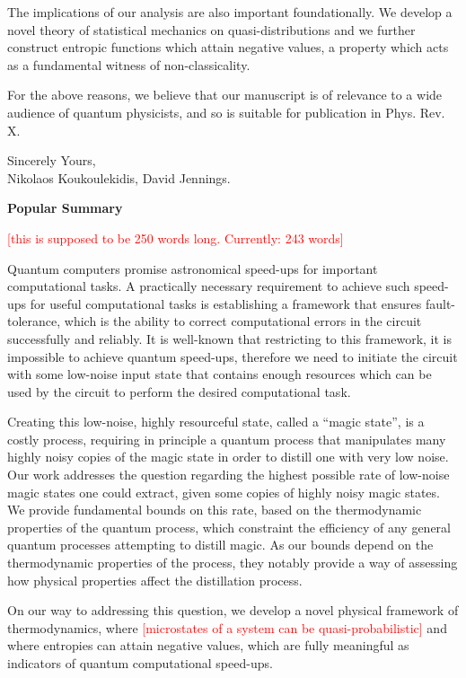 \documentclass[11pt]{letter}
\newcommand{\nick}[1]{\textcolor{red}{[#1]}}
\begin{document}
The implications of our analysis are also important foundationally.
We develop a novel theory of statistical mechanics on quasi-distributions and we further construct entropic functions which attain negative values, a property which acts as a fundamental witness of non-classicality.

For the above reasons, we believe that our manuscript is of relevance to a wide audience of quantum physicists, and so is suitable for publication in Phys. Rev. X.

\vspace{1cm}
\hspace{8cm}
\begin{minipage}{9cm}
\flushleft
Sincerely Yours,\\

Nikolaos Koukoulekidis, David Jennings.
\end{minipage}
\newpage


\textbf{Popular Summary}

\nick{this is supposed to be 250 words long. Currently: 243 words}

Quantum computers promise astronomical speed-ups for important computational tasks.
A practically necessary requirement to achieve such speed-ups for useful computational tasks is establishing a framework that ensures fault-tolerance, which is the ability to correct computational errors in the circuit successfully and reliably.
It is well-known that restricting to this framework, it is impossible to achieve quantum speed-ups, therefore we need to initiate the circuit with some low-noise input state that contains enough resources which can be used by the circuit to perform the desired computational task.

Creating this low-noise, highly resourceful state, called a ``magic state'', is a costly process, requiring in principle a quantum process that manipulates many highly noisy copies of the magic state in order to distill one with very low noise.
Our work addresses the question regarding the highest possible rate of low-noise magic states one could extract, given some copies of highly noisy magic states.
We provide fundamental bounds on this rate, based on the thermodynamic properties of the quantum process, which constraint the efficiency of any general quantum processes attempting to distill magic.
As our bounds depend on the thermodynamic properties of the process, they notably provide a way of assessing how physical properties affect the distillation process.

On our way to addressing this question, we develop a novel physical framework of thermodynamics, where \nick{microstates of a system can be quasi-probabilistic} and where entropies can attain negative values, which are fully meaningful as indicators of quantum computational speed-ups.
\end{document}
